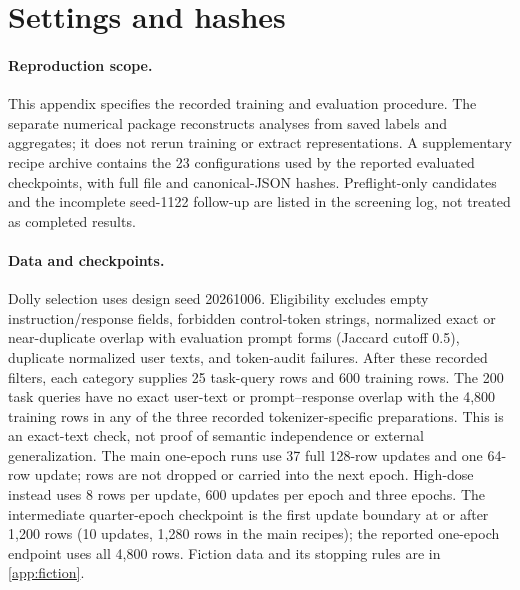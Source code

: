 \documentclass[11pt]{article}
\begin{document}
\FloatBarrier
\section{Settings and hashes}
\label{app:hashes}

\paragraph{Reproduction scope.} This appendix specifies the recorded training
and evaluation procedure. The separate numerical package reconstructs analyses
from saved labels and aggregates; it does not rerun training or extract
representations. A supplementary recipe archive contains the 23 configurations
used by the reported evaluated checkpoints, with full file and canonical-JSON
hashes. Preflight-only candidates and the incomplete seed-1122 follow-up are
listed in the screening log, not treated as completed results.

\paragraph{Data and checkpoints.} Dolly selection uses design seed 20261006.
Eligibility excludes empty instruction/response fields, forbidden control-token
strings, normalized exact or near-duplicate overlap with evaluation prompt forms
(Jaccard cutoff 0.5), duplicate normalized user texts, and token-audit failures.
After these recorded filters, each category supplies
25 task-query rows and 600 training rows. The 200 task queries have no exact
user-text or prompt--response overlap with the 4,800 training rows in any of
the three recorded tokenizer-specific preparations. This is an exact-text
check, not proof of semantic independence or external generalization.
The main one-epoch runs use 37 full 128-row updates and one 64-row update;
rows are not dropped or carried into the next epoch. High-dose instead uses
8 rows per update, 600 updates per epoch and three epochs. The intermediate
quarter-epoch checkpoint is the first update boundary at or after 1,200 rows
(10 updates, 1,280 rows in the main recipes); the reported one-epoch endpoint
uses all 4,800 rows. Fiction data and its stopping rules are in
\cref{app:fiction}.
\end{document}
